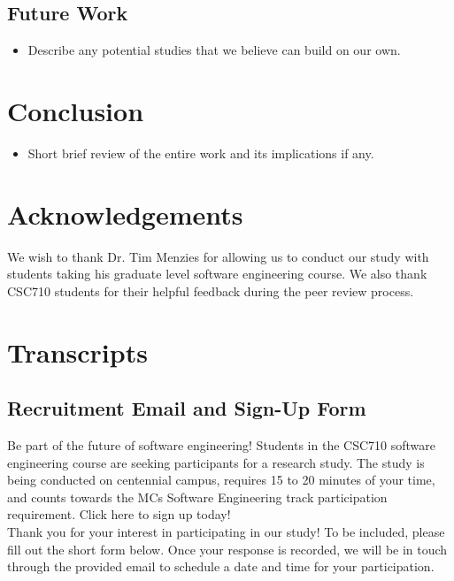 \documentclass{sig-alternate-05-2015}
\begin{document}
{\subsection{Future Work}

\begin{itemize}
    \item Describe any potential studies that we believe can build on our own.
\end{itemize}

\section{Conclusion}
\begin{itemize}
    \item Short brief review of the entire work and its implications if any.
\end{itemize}

\section*{Acknowledgements}
We wish to thank Dr. Tim Menzies for allowing us to conduct our study with students taking his graduate level software engineering course. We also thank CSC710 students for their helpful feedback during the peer review process. 




\newpage
\appendix

\section{Transcripts}

\subsection{Recruitment Email and Sign-Up Form}

\noindent Be part of the future of software engineering! Students in the CSC710 software engineering course are seeking participants for a research study. The study is being conducted on centennial campus, requires 15 to 20 minutes of your time, and counts towards the MCs Software Engineering track participation requirement. Click here to sign up today!\\

\noindent Thank you for your interest in participating in our study! To be included, please fill out the short form below. Once your response is recorded, we will be in touch through the provided email to schedule a date and time for your participation.

}
\end{document}
